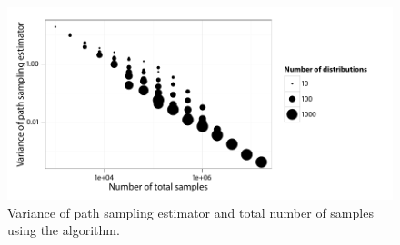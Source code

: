 \begin{figure}[t]
  \linespread{1.1}\selectfont
  \includegraphics[width=\linewidth]{fig_src/Particle_Iter_Var}
  \caption[Variance of path sampling estimator and total number of samples
  using \protect\smc algorithm]
  {Variance of path sampling estimator and total number of samples
    using the \smc[2] algorithm.}
  \label{fig:particle iter num}
\end{figure}
